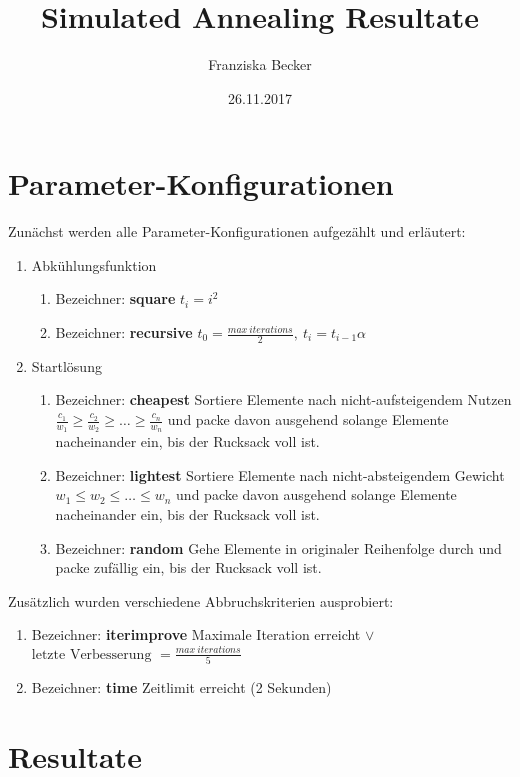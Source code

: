 \documentclass[11pt,a4paper]{article}
\title{\vspace{-2.5cm}Simulated Annealing Resultate}
\author{Franziska Becker}
\date{26.11.2017}
\begin{document}
\maketitle

\section{Parameter-Konfigurationen}

Zunächst werden alle Parameter-Konfigurationen aufgezählt und erläutert:
\begin{enumerate}
    \item Abkühlungsfunktion
      \begin{enumerate}
        \item Bezeichner: \textbf{square} \(t_i = i^2\)
            \item Bezeichner: \textbf{recursive} \(t_0 = \frac{max~iterations}{2}, ~t_i = t_{i-1}\alpha\)
      \end{enumerate}
    \item Startlösung
      \begin{enumerate}
        \item Bezeichner: \textbf{cheapest} Sortiere Elemente nach nicht-aufsteigendem Nutzen \(\frac{c_1}{w_1} \geq \frac{c_2}{w_2} \geq \dots \geq \frac{c_n}{w_n}\) und packe davon ausgehend solange Elemente nacheinander ein, bis der Rucksack voll ist.
            \item Bezeichner: \textbf{lightest} Sortiere Elemente nach nicht-absteigendem Gewicht \(w_1 \leq w_2 \leq \dots \leq w_n\) und packe davon ausgehend solange Elemente nacheinander ein, bis der Rucksack voll ist.
            \item Bezeichner: \textbf{random} Gehe Elemente in originaler Reihenfolge durch und packe zufällig ein, bis der Rucksack voll ist.
      \end{enumerate}
\end{enumerate}

Zusätzlich wurden verschiedene Abbruchskriterien ausprobiert:
\begin{enumerate}
    \item Bezeichner: \textbf{iterimprove} Maximale Iteration erreicht \(\lor\) \(\text{letzte Verbesserung } = \frac{max~iterations}{5}\)
    \item Bezeichner: \textbf{time} Zeitlimit erreicht (2 Sekunden)
\end{enumerate}

\section{Resultate}
\end{document}
